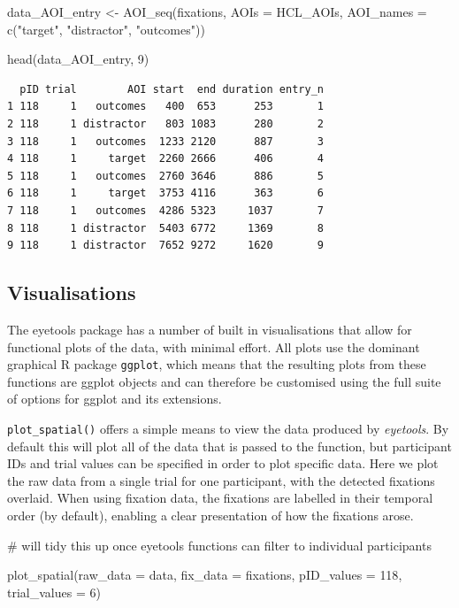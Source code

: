 \documentclass[
  man,
  floatsintext,
  longtable,
  nolmodern,
  notxfonts,
  notimes,
  colorlinks=true,linkcolor=blue,citecolor=blue,urlcolor=blue]{apa7}
\newenvironment{Shaded}{\begin{snugshade}}{\end{snugshade}}
\newcommand{\AttributeTok}[1]{\textcolor[rgb]{0.40,0.45,0.13}{#1}}
\newcommand{\CommentTok}[1]{\textcolor[rgb]{0.37,0.37,0.37}{#1}}
\newcommand{\DecValTok}[1]{\textcolor[rgb]{0.68,0.00,0.00}{#1}}
\newcommand{\FunctionTok}[1]{\textcolor[rgb]{0.28,0.35,0.67}{#1}}
\newcommand{\NormalTok}[1]{\textcolor[rgb]{0.00,0.23,0.31}{#1}}
\newcommand{\OtherTok}[1]{\textcolor[rgb]{0.00,0.23,0.31}{#1}}
\newcommand{\StringTok}[1]{\textcolor[rgb]{0.13,0.47,0.30}{#1}}
\begin{document}
\begin{Shaded}
\begin{Highlighting}[]
\NormalTok{data\_AOI\_entry }\OtherTok{\textless{}{-}} 
  \FunctionTok{AOI\_seq}\NormalTok{(fixations, }
          \AttributeTok{AOIs =}\NormalTok{ HCL\_AOIs,}
          \AttributeTok{AOI\_names =} \FunctionTok{c}\NormalTok{(}\StringTok{"target"}\NormalTok{, }\StringTok{"distractor"}\NormalTok{, }\StringTok{"outcomes"}\NormalTok{))}

\FunctionTok{head}\NormalTok{(data\_AOI\_entry, }\DecValTok{9}\NormalTok{)}
\end{Highlighting}
\end{Shaded}

\begin{verbatim}
  pID trial        AOI start  end duration entry_n
1 118     1   outcomes   400  653      253       1
2 118     1 distractor   803 1083      280       2
3 118     1   outcomes  1233 2120      887       3
4 118     1     target  2260 2666      406       4
5 118     1   outcomes  2760 3646      886       5
6 118     1     target  3753 4116      363       6
7 118     1   outcomes  4286 5323     1037       7
8 118     1 distractor  5403 6772     1369       8
9 118     1 distractor  7652 9272     1620       9
\end{verbatim}

\subsection{Visualisations}\label{visualisations}

The eyetools package has a number of built in visualisations that allow
for functional plots of the data, with minimal effort. All plots use the
dominant graphical R package \texttt{ggplot}, which means that the
resulting plots from these functions are ggplot objects and can
therefore be customised using the full suite of options for ggplot and
its extensions.

\texttt{plot\_spatial()} offers a simple means to view the data produced
by \emph{eyetools}. By default this will plot all of the data that is
passed to the function, but participant IDs and trial values can be
specified in order to plot specific data. Here we plot the raw data from
a single trial for one participant, with the detected fixations
overlaid. When using fixation data, the fixations are labelled in their
temporal order (by default), enabling a clear presentation of how the
fixations arose.

\begin{Shaded}
\begin{Highlighting}[]
\CommentTok{\# will tidy this up once eyetools functions can filter to individual participants}

\FunctionTok{plot\_spatial}\NormalTok{(}\AttributeTok{raw\_data =}\NormalTok{ data,}
             \AttributeTok{fix\_data =}\NormalTok{ fixations,}
             \AttributeTok{pID\_values =} \DecValTok{118}\NormalTok{,}
             \AttributeTok{trial\_values =} \DecValTok{6}\NormalTok{)}
\end{Highlighting}
\end{Shaded}
\end{document}
